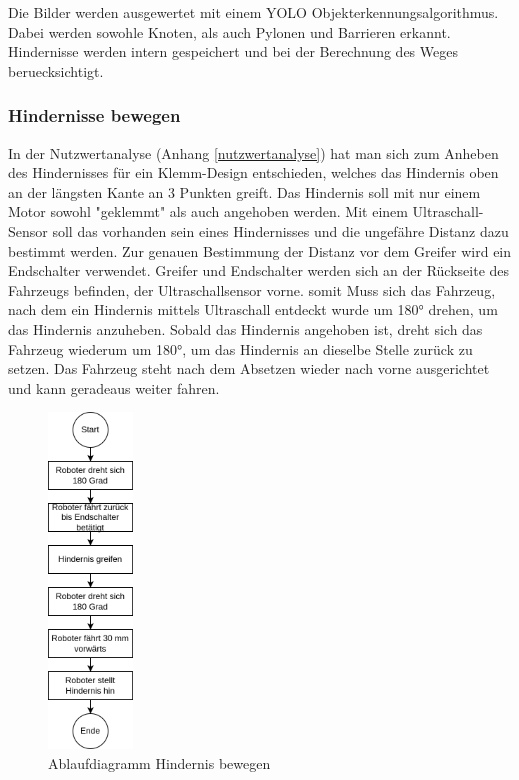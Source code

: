 Die Bilder werden ausgewertet mit einem YOLO Objekterkennungsalgorithmus. Dabei werden sowohle Knoten, als auch Pylonen und Barrieren erkannt. Hindernisse werden intern gespeichert und bei der Berechnung des Weges beruecksichtigt.


\newpage

\subsubsection{Hindernisse bewegen}

In der Nutzwertanalyse (Anhang \ref{nutzwertanalyse}) hat man sich zum Anheben des Hindernisses für ein Klemm-Design entschieden, welches das Hindernis oben an der längsten Kante an 3 Punkten greift. Das Hindernis soll mit nur einem Motor sowohl "geklemmt" als auch angehoben werden. Mit einem Ultraschall-Sensor soll das vorhanden sein eines Hindernisses und die ungefähre Distanz dazu bestimmt werden. Zur genauen Bestimmung der Distanz vor dem Greifer wird ein Endschalter verwendet.
Greifer und Endschalter werden sich an der Rückseite des Fahrzeugs befinden, der Ultraschallsensor vorne. somit Muss sich das Fahrzeug, nach dem ein Hindernis mittels Ultraschall entdeckt wurde um 180° drehen, um das Hindernis anzuheben. Sobald das Hindernis angehoben ist, dreht sich das Fahrzeug wiederum um 180°, um das Hindernis an dieselbe Stelle zurück zu setzen. Das Fahrzeug steht nach dem Absetzen wieder nach vorne ausgerichtet und kann geradeaus weiter fahren. 

\begin{figure}[H]
\centering
\includegraphics[width=0.2\textwidth]{assets/gesamtkonzept/ablaufdiagramm-hindernis-bewegen.png}
\caption{Ablaufdiagramm Hindernis bewegen}
\label{fig:ablaufdiagramm-hindernis-bewegen}
\end{figure}

